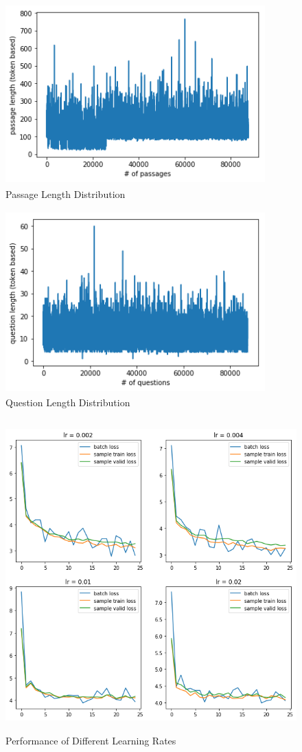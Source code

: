 \documentclass[modernstyle,12pt]{sjsuthesis}
\theoremstyle{definition}
\begin{document}
\begin{figure}[htbp]\centering
  \includegraphics[width=10cm, height=7cm]{figures/passage_length.png}
  \caption{Passage Length Distribution}
  \label{f:passage_length}
\end{figure}

\begin{figure}[htbp]\centering
  \includegraphics[width=10cm, height=7cm]{figures/question_length.png}
  \caption{Question Length Distribution}
  \label{f:question_length}
\end{figure}

\begin{figure}[htbp]\centering
  \includegraphics[width=12cm, height=12cm]{figures/lr.png}
  \caption{Performance of Different Learning Rates}
  \label{f:lr}
\end{figure}
\end{document}
